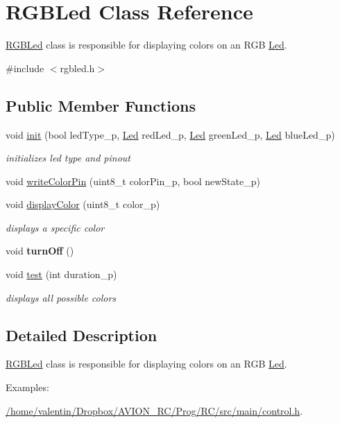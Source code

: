 \hypertarget{class_r_g_b_led}{}\section{R\+G\+B\+Led Class Reference}
\label{class_r_g_b_led}


\hyperlink{class_r_g_b_led}{R\+G\+B\+Led} class is responsible for displaying colors on an R\+GB \hyperlink{class_led}{Led}.  




{\ttfamily \#include $<$rgbled.\+h$>$}

\subsection*{Public Member Functions}
\begin{DoxyCompactItemize}
\item 
void \hyperlink{class_r_g_b_led_aa155ff1ce0d93655139e7eb54cc22bf4}{init} (bool led\+Type\+\_\+p, \hyperlink{class_led}{Led} red\+Led\+\_\+p, \hyperlink{class_led}{Led} green\+Led\+\_\+p, \hyperlink{class_led}{Led} blue\+Led\+\_\+p)
\begin{DoxyCompactList}\small\item\em initializes led type and pinout \end{DoxyCompactList}\item 
void \hyperlink{class_r_g_b_led_a9ab9701eb0f4d945fd9ca6e2235d7ee9}{write\+Color\+Pin} (uint8\+\_\+t color\+Pin\+\_\+p, bool new\+State\+\_\+p)
\item 
void \hyperlink{class_r_g_b_led_a6a1e12a1f48fc29acd30aa88a1cfd1b1}{display\+Color} (uint8\+\_\+t color\+\_\+p)
\begin{DoxyCompactList}\small\item\em displays a specific color \end{DoxyCompactList}\item 
\mbox{\label{class_r_g_b_led_af00b4e0ef8ec0aea4452fc2133b03453}} 
void {\bfseries turn\+Off} ()
\item 
void \hyperlink{class_r_g_b_led_ab5c88bff636d49c1eaa34e75f6b4e380}{test} (int duration\+\_\+p)
\begin{DoxyCompactList}\small\item\em displays all possible colors \end{DoxyCompactList}\end{DoxyCompactItemize}


\subsection{Detailed Description}
\hyperlink{class_r_g_b_led}{R\+G\+B\+Led} class is responsible for displaying colors on an R\+GB \hyperlink{class_led}{Led}. \begin{Desc}
\item[Examples\+: ]\par
\hyperlink{_2home_2valentin_2_dropbox_2_a_v_i_o_n__r_c_2_prog_2_r_c_2src_2main_2control_8h-example}{/home/valentin/\+Dropbox/\+A\+V\+I\+O\+N\+\_\+\+R\+C/\+Prog/\+R\+C/src/main/control.\+h}.\end{Desc}


